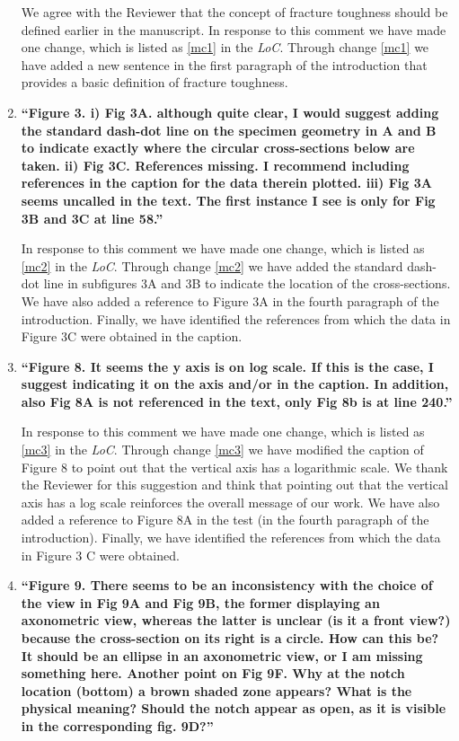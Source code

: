 \documentclass[11pt,letterpaper]{report}
\begin{document}
\begin{enumerate}[label=\textit{2.\arabic*},wide, labelwidth=!, labelindent=0pt]
We agree with the Reviewer that the concept of fracture toughness should be defined earlier in the manuscript. In response to this comment we have made one change, which is listed as \ref{mc1} in the \textit{LoC}.
%
Through change \ref{mc1} we have added a new sentence in the first paragraph of the introduction that provides a basic definition of fracture toughness.

\item \label{r2c4} {\bf ``Figure 3. i) Fig 3A. although quite clear, I would suggest adding the standard dash-dot line on the specimen geometry in A and B to indicate exactly where the circular cross-sections below are taken. ii) Fig 3C. References missing. I recommend including references in the caption for the data therein plotted. iii) Fig 3A seems uncalled in the text. The first instance I see is only for Fig 3B and 3C at line 58.''}

In response to this comment we have made one change, which is listed as \ref{mc2} in the \textit{LoC}.
%
Through change \ref{mc2} we have added the standard dash-dot line in subfigures 3A and 3B to indicate the location of the cross-sections. We have also added a reference to Figure 3A in the fourth paragraph of the introduction. Finally, we have identified the references from which the data in Figure 3C were obtained in the caption.

\item \label{r2c5} {\bf ``Figure 8. It seems the y axis is on log scale. If this is the case, I suggest indicating it on the axis and/or in the caption. In addition, also Fig 8A is not referenced in the text, only Fig 8b is at line 240.''}

In response to this comment we have made one change, which is listed as \ref{mc3} in the \textit{LoC}.
%
Through change \ref{mc3} we have modified the caption of Figure 8 to point out that the vertical axis has a logarithmic scale. We thank the Reviewer for this suggestion and think that pointing out that the vertical axis has a log scale reinforces the overall message of our work. We have also added a reference to Figure 8A in the test (in the fourth paragraph of the introduction). Finally, we have identified the references from which the data in Figure 3 C were obtained.

\item \label{r2c6} {\bf ``Figure 9. There seems to be an inconsistency with the choice of the view in Fig 9A and Fig 9B, the former displaying an axonometric view, whereas the latter is unclear (is it a front view?) because the cross-section on its right is a circle. How can this be? It should be an ellipse in an axonometric view, or I am missing something here. Another point on Fig 9F. Why at the notch location (bottom) a brown shaded zone appears? What is the physical meaning? Should the notch appear as open, as it is visible in the corresponding fig. 9D?''}


\end{enumerate}
\end{document}
